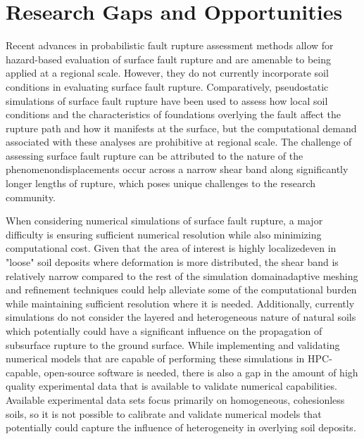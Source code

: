 \section{Research Gaps and Opportunities}
\label{sec:eq_surface_rup_research_gaps}
Recent advances in probabilistic fault rupture assessment methods allow for hazard-based evaluation of surface fault rupture and are amenable to being applied at a regional scale. However, they do not currently incorporate soil conditions in evaluating surface fault rupture. Comparatively, pseudostatic simulations of surface fault rupture have been used to assess how local soil conditions and the characteristics of foundations overlying the fault affect the rupture path and how it manifests at the surface, but the computational demand associated with these analyses are prohibitive at regional scale. The challenge of assessing surface fault rupture can be attributed to the nature of the phenomenon\textemdash displacements occur across a narrow shear band along significantly longer lengths of rupture, which poses unique challenges to the research community.


When considering numerical simulations of surface fault rupture, a major difficulty is ensuring sufficient numerical resolution while also minimizing computational cost. Given that the area of interest is highly localized\textemdash even in "loose" soil deposits where deformation is more distributed, the shear band is relatively narrow compared to the rest of the simulation domain\textemdash adaptive meshing and refinement techniques could help alleviate some of the computational burden while maintaining sufficient resolution where it is needed. Additionally, currently simulations do not consider the layered and heterogeneous nature of natural soils which potentially could have a significant influence on the propagation of subsurface rupture to the ground surface. While implementing and validating numerical models that are capable of performing these simulations in HPC-capable, open-source software is needed, there is also a gap in the amount of high quality experimental data that is available to validate numerical capabilities. Available experimental data sets focus primarily on homogeneous, cohesionless soils, so it is not possible to calibrate and validate numerical models that potentially could capture the influence of heterogeneity in overlying soil deposits.

